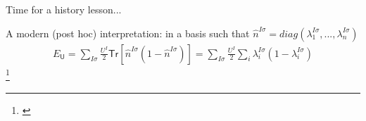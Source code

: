 \documentclass[xcolor=table,aspectratio=169]{beamer}
\newcommand\blfootcite[1]{%
  \begingroup
  \renewcommand\thefootnote{}\footnote{\hspace{-4ex}\cite{#1}}%
  \addtocounter{footnote}{-1}%
  \endgroup
}
\newcommand{\Trace}{\mathsf{Tr}}
\numberwithin{equation}{section}
\begin{document}
\begin{frame}{Time for a history lesson...}

    \vspace{-3ex}
    \begin{center}
    \end{center}

    \small
    A modern (post hoc) interpretation:
    in a basis such that $\hat n^{I\sigma} =diag(\lambda^{I\sigma}_1, ... ,\lambda^{I\sigma}_n)$
    \begin{align*}
        E_\mathsf{U} = \sum_{I\sigma} \frac{U^I}{2}\Trace[\hat n^{I\sigma}(1-\hat n^{I\sigma})]
        = \sum_{I\sigma} \frac{U^I}{2}\sum_i \lambda^{I\sigma}_i (1-\lambda^{I\sigma}_i)
    \end{align*}
    \blfootcite{Cococcioni2005a}
\end{frame}
\end{document}
